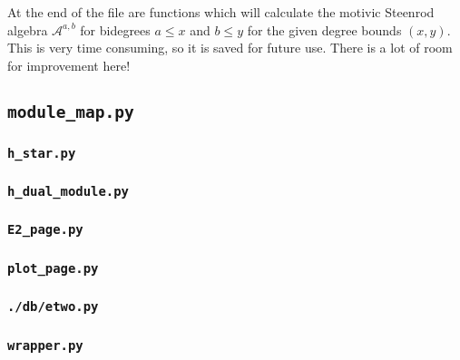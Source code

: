 \documentclass{article}
\newcommand{\calA}{\mathcal{A}}
\begin{document}
At the end of the file are functions which will calculate the motivic
Steenrod algebra $\calA^{a,b}$ for bidegrees $a\leq x$ and $b\leq y$
for the given degree bounds $(x,y)$. This is very time consuming, so
it is saved for future use. There is a lot of room for improvement
here!

\subsection{{\tt module\_map.py}}

\subsubsection{{\tt h\_star.py}}
\subsubsection{{\tt h\_dual\_module.py}}
\subsubsection{{\tt E2\_page.py}}
\subsubsection{{\tt plot\_page.py}}
\subsubsection{{\tt ./db/etwo.py}}
\subsubsection{{\tt wrapper.py}}
\end{document}
